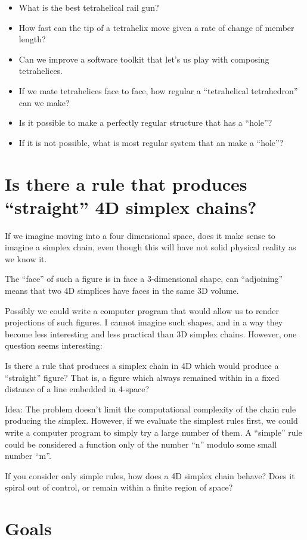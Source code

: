 \documentclass[11pt]{article}
\begin{document}
\begin{itemize}
\item What is the best tetrahelical rail gun?
\item How fast can the tip of a tetrahelix move given a rate of change of member length?
\item Can we improve a software toolkit that let's us play with composing tetrahelices.
\item If we mate tetrahelices face to face, how regular a ``tetrahelical tetrahedron'' can we make?
\item Is it possible to make a perfectly regular structure that has a ``hole''?
\item If it is not possible, what is most regular system that an make a ``hole''?
\end{itemize}

\section{Is there a rule that produces ``straight'' 4D simplex chains?}

If we imagine moving into a four dimensional space, does it make sense to imagine a simplex chain, even though this will have
not solid physical reality as we know it.

The ``face'' of such a figure is in face a 3-dimensional shape, can ``adjoining'' means that two 4D simplices have faces in the same 3D volume.

Possibly we could write a computer program that would allow us to render projections of such figures.
I cannot imagine such shapes, and in a way they become less interesting and less practical than 3D simplex chains.
However, one question seems interesting:

Is there a rule that produces a simplex chain in 4D which would produce a ``straight'' figure?
That is, a figure which always remained within in a fixed distance of a line embedded in 4-space?

Idea: The problem doesn't limit the computational complexity of the chain rule producing the simplex.
However, if we evaluate the simplest rules first, we could write a computer program to simply try a large number
of them. A ``simple'' rule could be considered a function only of the number ``n'' modulo some small number ``m''.

If you consider only simple rules, how does a 4D simplex chain behave? Does it spiral out of control, or remain within
a finite region of space? 


\section{Goals}
\end{document}
